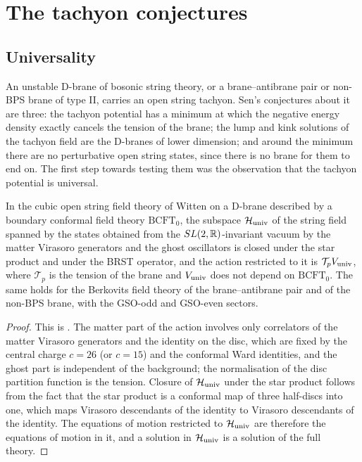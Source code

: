 \section{The tachyon conjectures}\label{sec:tachyon}

\subsection{Universality}\label{ssec:universality}

An unstable D-brane of bosonic string theory, or a brane--antibrane pair or non-BPS brane of type II, carries an open string tachyon. Sen's conjectures about it \cite{Sen98bab,Sen99nonBPS} are three: the tachyon potential has a minimum at which the negative energy density exactly cancels the tension of the brane; the lump and kink solutions of the tachyon field are the D-branes of lower dimension; and around the minimum there are no perturbative open string states, since there is no brane for them to end on. The first step towards testing them was the observation \cite{Sen99univ} that the tachyon potential is universal.

\begin{theorem}\label{thm:universality}
In the cubic open string field theory of Witten on a D-brane described by a boundary conformal field theory $\mathrm{BCFT}_0$, the subspace $\mathcal H_{\rm univ}$ of the string field spanned by the states obtained from the $SL(2,\mathbb{R})$-invariant vacuum by the matter Virasoro generators and the ghost oscillators is closed under the star product and under the BRST operator, and the action restricted to it is $\mathcal T_p V_{\rm univ}$, where $\mathcal T_p$ is the tension of the brane and $V_{\rm univ}$ does not depend on $\mathrm{BCFT}_0$. The same holds for the Berkovits field theory of the brane--antibrane pair and of the non-BPS brane, with the GSO-odd and GSO-even sectors.
\end{theorem}

\begin{proof}
This is \cite[Sections~2 and~3]{Sen99univ}. The matter part of the action involves only correlators of the matter Virasoro generators and the identity on the disc, which are fixed by the central charge $c=26$ (or $c=15$) and the conformal Ward identities, and the ghost part is independent of the background; the normalisation of the disc partition function is the tension. Closure of $\mathcal H_{\rm univ}$ under the star product follows from the fact that the star product is a conformal map of three half-discs into one, which maps Virasoro descendants of the identity to Virasoro descendants of the identity. The equations of motion restricted to $\mathcal H_{\rm univ}$ are therefore the equations of motion in it, and a solution in $\mathcal H_{\rm univ}$ is a solution of the full theory.
\end{proof}

